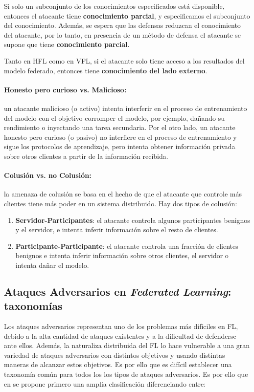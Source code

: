 \begin{itemize}
        Si solo un subconjunto de los conocimientos especificados está disponible, entonces el atacante tiene \textbf{conocimiento parcial}, y especificamos el subconjunto del conocimiento. Además, se espera que las defensas reduzcan el conocimiento del atacante, por lo tanto, en presencia de un método de defensa el atacante se supone que tiene \textbf{conocimiento parcial}.

        Tanto en \ac{HFL} como en \ac{VFL}, si el atacante solo tiene acceso a los resultados del modelo federado, entonces tiene \textbf{conocimiento del lado externo}.
        
        \paragraph{Honesto pero curioso vs. Malicioso:} un atacante malicioso (o activo) intenta interferir en el proceso de entrenamiento del modelo con el objetivo corromper el modelo, por ejemplo, dañando su rendimiento o inyectando una tarea secundaria. Por el otro lado, un atacante honesto pero curioso (o pasivo) no interfiere en el proceso de entrenamiento y sigue los protocolos de aprendizaje, pero intenta obtener información privada sobre otros clientes a partir de la información recibida.

        
        \paragraph{Colusión vs. no Colusión:} la amenaza de colusión se basa en el hecho de que el atacante que controle más clientes tiene más poder en un sistema distribuido. Hay dos tipos de colusión:
        \begin{enumerate}
            \item \textbf{Servidor-Participantes}: el atacante controla algunos participantes benignos y el servidor, e intenta inferir información sobre el resto de clientes.
            \item \textbf{Participante-Participante}: el atacante controla una fracción de clientes benignos e intenta inferir información sobre otros clientes, el servidor o intenta dañar el modelo.
        \end{enumerate}
\end{itemize}

\subsection{Ataques Adversarios en \textit{Federated Learning}: taxonomías}
Los ataques adversarios representan uno de los problemas más difíciles en \ac{FL}, debido a la alta cantidad de ataques existentes y a la dificultad de defenderse ante ellos. Además, la naturaliza distribuida del \ac{FL} lo hace vulnerable a una gran variedad de ataques adversarios con distintos objetivos y usando distintas maneras de alcanzar estos objetivos. Es por ello que es difícil establecer una taxonomía común para todos los los tipos de ataques adversarios. Es por ello que en \cite{survey-nuria-2023} se propone primero una amplia clasificación diferenciando entre:
    
